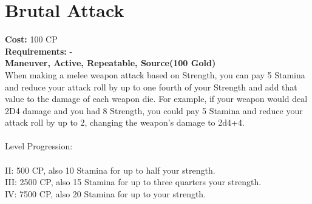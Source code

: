 \section{Brutal Attack}
\textbf{Cost:} 100 CP\\
\textbf{Requirements:} -\\
\textbf{Maneuver, Active, Repeatable, Source(100 Gold)}\\
When making a melee weapon attack based on Strength, you can pay 5 Stamina and reduce your attack roll by up to one fourth of your Strength and add that value to the damage of each weapon die. For example, if your weapon would deal 2D4 damage and you had 8 Strength, you could pay 5 Stamina and reduce your attack roll by up to 2, changing the weapon's damage to 2d4+4.\\
\\
Level Progression:\\
\\
II: 500 CP, also 10 Stamina for up to half your strength.\\
III: 2500 CP, also 15 Stamina for up to three quarters your strength.\\
IV: 7500 CP, also 20 Stamina for up to your strength.\\